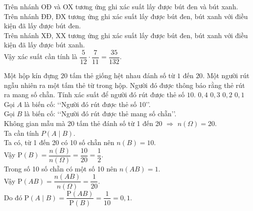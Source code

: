 \begin{ex}
{\begin{center}
		\end{center}
		Trên nhánh OĐ và OX tương ứng ghi xác suất lấy được bút đen và bút xanh.\\
		Trên nhánh ĐĐ, ĐX tương ứng ghi xác suất lấy được bút đen, bút xanh với điều kiện đã lấy được bút đen.\\
		Trên nhánh XĐ, XX tương ứng ghi xác suất lấy được bút đen, bút xanh với điều kiện đã lấy được bút xanh.\\
		Vậy xác suất cần tính là $\dfrac{5}{12}\cdot\dfrac{7}{11}=\dfrac{35}{132}$.
	}
	
\end{ex}

\begin{ex}%
	Một hộp kín đựng $20$ tấm thẻ giống hệt nhau đánh số từ $1$ đến $20$. Một người rút ngẫu nhiên ra một tấm thẻ từ trong hộp. Người đó được thông báo rằng thẻ rút ra mang số chẵn. Tính xác suất để người đó rút được thẻ số $10$.
	\choice
	{$0{,}4$}
	{$0{,}3$}
	{$0{,}2$}
	{\True$0{,}1$}
	\loigiai
	{	Gọi $A$ là biến cố: \lq\lq Người đó rút được thẻ số 10\rq\rq.\\
		Gọi $B$ là biến cố: \lq\lq Người đó rút được thẻ mang số chẵn\rq\rq .\\
		Không gian mẫu mà 20 tấm thẻ đánh số từ 1 đến 20 $\Rightarrow$ $n(\Omega)=20$.\\
		Ta cần tính $P\left(A\mid B\right)$.\\
		Ta có, từ 1 đến 20 có 10 số chẵn nên $n(B)=10$.\\
		Vậy $\mathrm{P}(B)=\dfrac{n(B)}{n(\Omega)}=\dfrac{10}{20}=\dfrac{1}{2}$.\\
		Trong số 10 số chẵn có một số 10 nên $n(AB)=1$.\\
		Vậy $\mathrm{P}(AB)=\dfrac{n(AB)}{n(\Omega)}=\dfrac{1}{20}$.\\
		Do đó $\mathrm{P}(A\mid B)=\dfrac{\mathrm{P}(AB)}{\mathrm{P}(B)}=\dfrac{1}{10}= 0{,}1$.
	}
\end{ex}

